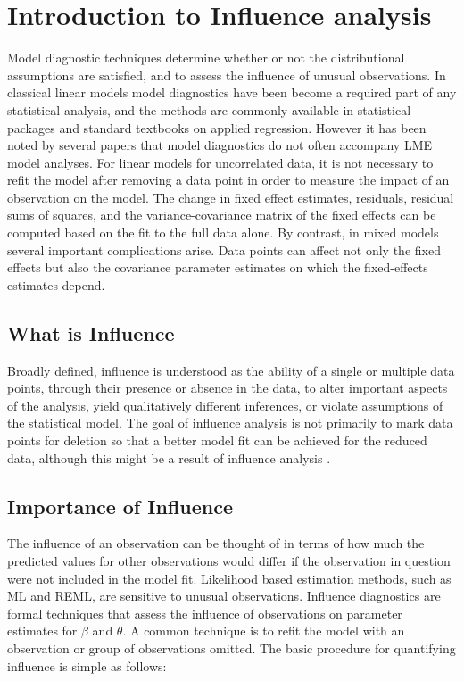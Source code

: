 \documentclass[Main.tex]{subfiles}
\begin{document}
\section{Introduction to Influence analysis} %
 Model diagnostic techniques determine whether or not the distributional assumptions are satisfied, and to assess the influence of unusual observations. In classical linear models model diagnostics have been become a required part of any statistical analysis, and the methods are commonly available in statistical packages and standard textbooks on applied regression. However it has been noted by several papers that model diagnostics do not often accompany LME model analyses.
For linear models for uncorrelated data, it is not necessary to refit the model after removing a data point in order to measure the impact of an observation on the model. The change in fixed effect estimates, residuals, residual sums of squares, and the variance-covariance matrix of the fixed effects can be computed based on the fit to the full data alone. By contrast, in mixed models several important complications arise. Data points can affect not only the fixed effects but also the covariance parameter estimates on which the fixed-effects estimates depend. 

\subsection{What is Influence} %


Broadly defined, influence is understood as the ability of a single or multiple data points, through their presence or absence in the data, to alter important aspects of the analysis, yield qualitatively different inferences, or violate assumptions of the statistical model. The goal of influence analysis is not primarily to mark data points for deletion so that a better model fit can be achieved for the reduced data, although this might be a result of influence analysis \citep{schabenberger}.


\subsection{Importance of Influence}
The influence of an observation can be thought of in terms of how much the predicted values for other observations would differ if the observation in question were not included in the model fit.
Likelihood based estimation methods, such as ML and REML, are sensitive to unusual observations. Influence diagnostics are formal techniques that assess the influence of observations on parameter estimates for $\beta$ and $\theta$. A common technique is to refit the model with an observation or group of observations omitted. The basic procedure for quantifying influence is simple as follows:
\end{document}
